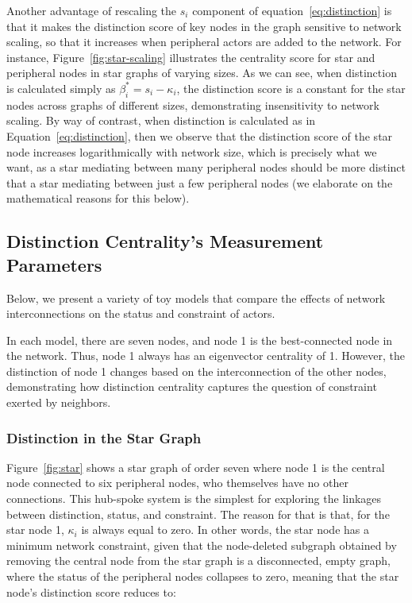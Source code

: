 \documentclass[12pt]{article}
\begin{document}
Another advantage of rescaling the $s_i$ component of equation~\ref{eq:distinction} is that it makes the distinction score of key nodes in the graph sensitive to network scaling, so that it increases when peripheral actors are added to the network. For instance, Figure~\ref{fig:star-scaling} illustrates the centrality score for star and peripheral nodes in star graphs of varying sizes. As we can see, when distinction is calculated simply as $\beta^*_i = s_i - \kappa_i$, the distinction score is a constant for the star nodes across graphs of different sizes, demonstrating insensitivity to network scaling. By way of contrast, when distinction is calculated as in Equation~\ref{eq:distinction}, then we observe that the distinction score of the star node increases logarithmically with network size, which is precisely what we want, as a star mediating between many peripheral nodes should be more distinct that a star mediating between just a few peripheral nodes (we elaborate on the mathematical reasons for this below).  

\subsection{Distinction Centrality's Measurement Parameters}
Below, we present a variety of toy models that compare the effects of network interconnections on the status and constraint of actors.

In each model, there are seven nodes, and node 1 is the best-connected node in the network. Thus, node 1 always has an eigenvector centrality of 1. However, the distinction of node 1 changes based on the interconnection of the other nodes, demonstrating how distinction centrality captures the question of constraint exerted by neighbors. 

\subsubsection{Distinction in the Star Graph}
Figure~\ref{fig:star} shows a star graph of order seven where node 1 is the central node connected to six peripheral nodes, who themselves have no other connections. This hub-spoke system is the simplest for exploring the linkages between distinction, status, and constraint. The reason for that is that, for the star node 1, $\kappa_i$ is always equal to zero. In other words, the star node has a minimum network constraint, given that the node-deleted subgraph obtained by removing the central node from the star graph is a disconnected, empty graph, where the status of the peripheral nodes collapses to zero, meaning that the star node's distinction score reduces to:
\end{document}
